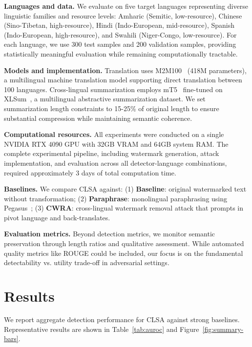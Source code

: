 \documentclass{article}
\begin{document}
\textbf{Languages and data.} We evaluate on five target languages representing diverse linguistic families and resource levels: Amharic (Semitic, low-resource), Chinese (Sino-Tibetan, high-resource), Hindi (Indo-European, mid-resource), Spanish (Indo-European, high-resource), and Swahili (Niger-Congo, low-resource). For each language, we use 300 test samples and 200 validation samples, providing statistically meaningful evaluation while remaining computationally tractable.

\textbf{Models and implementation.} Translation uses M2M100~\citep{fan2021beyond} (418M parameters), a multilingual machine translation model supporting direct translation between 100 languages. Cross-lingual summarization employs mT5~\citep{xue2021mt5} fine-tuned on XLSum~\citep{hasan2021xl}, a multilingual abstractive summarization dataset. We set summarization length constraints to 15-25\% of original length to ensure substantial compression while maintaining semantic coherence.

\textbf{Computational resources.} All experiments were conducted on a single NVIDIA RTX 4090 GPU with 32GB VRAM and 64GB system RAM. The complete experimental pipeline, including watermark generation, attack implementation, and evaluation across all detector-language combinations, required approximately 3 days of total computation time.

\textbf{Baselines.} We compare CLSA against: (1) \textbf{Baseline}: original watermarked text without transformation; (2) \textbf{Paraphrase}: monolingual paraphrasing using Pegasus~\citep{zhang2020pegasus}; (3) \textbf{CWRA}: cross-lingual watermark removal attack that prompts in pivot language and back-translates.

\textbf{Evaluation metrics.} Beyond detection metrics, we monitor semantic preservation through length ratios and qualitative assessment. While automated quality metrics like ROUGE could be included, our focus is on the fundamental detectability vs. utility trade-off in adversarial settings.

\section{Results}

We report aggregate detection performance for CLSA against strong baselines. Representative results are shown in Table~\ref{tab:auroc} and Figure~\ref{fig:summary-bars}.
\end{document}
